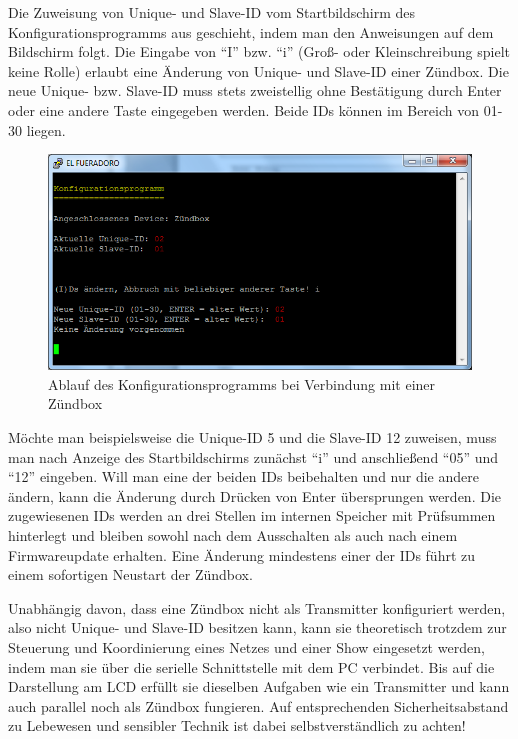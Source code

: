 \documentclass[pdftex, parskip, numbers=noenddot, toc=listof]{scrbook}
\begin{document}
	Die Zuweisung von Unique- und Slave-ID vom Startbildschirm des Konfigurationsprogramms aus geschieht, indem man den Anweisungen auf dem Bildschirm folgt. Die Eingabe von \enquote{I} bzw. \enquote{i} (Groß- oder Kleinschreibung spielt keine Rolle) erlaubt eine Änderung von Unique- und Slave-ID einer Zündbox. Die neue Unique- bzw. Slave-ID muss stets zweistellig ohne Bestätigung durch Enter oder eine andere Taste eingegeben werden. Beide IDs können im Bereich von 01-30 liegen.

	\begin{figure}
		\centering
		\includegraphics[width=.8\textwidth]{Bilder/conf}
		\caption{Ablauf des Konfigurationsprogramms bei Verbindung mit einer Zündbox}
		\label{fig:conf}
	\end{figure}

	Möchte man beispielsweise die Unique-ID 5 und die Slave-ID 12 zuweisen, muss man nach Anzeige des Startbildschirms zunächst \enquote{i} und anschließend \enquote{05} und \enquote{12} eingeben. Will man eine der beiden IDs beibehalten und nur die andere ändern, kann die Änderung durch Drücken von Enter übersprungen werden. Die zugewiesenen IDs werden an drei Stellen im internen Speicher mit Prüfsummen hinterlegt und bleiben sowohl nach dem Ausschalten als auch nach einem Firmwareupdate erhalten. Eine Änderung mindestens einer der IDs führt zu einem sofortigen Neustart der Zündbox.

	Unabhängig davon, dass eine Zündbox nicht als Transmitter konfiguriert werden, also nicht Unique- und Slave-ID  besitzen kann, kann sie theoretisch trotzdem zur Steuerung und Koordinierung eines Netzes und einer Show eingesetzt werden, indem man sie über die serielle Schnittstelle mit dem PC verbindet. Bis auf die Darstellung am LCD erfüllt sie dieselben Aufgaben wie ein Transmitter und kann auch parallel noch als Zündbox fungieren. Auf entsprechenden Sicherheitsabstand zu Lebewesen und sensibler Technik ist dabei selbstverständlich zu achten!
\end{document}
